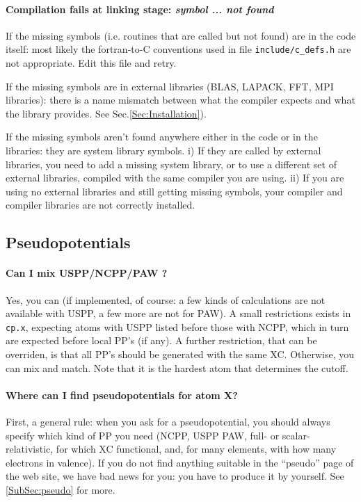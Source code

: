 \documentclass[12pt,a4paper]{article}
\begin{document}
\paragraph{Compilation fails at linking stage: {\em symbol ... not found}}
If the missing symbols (i.e. routines that are called but not found)
are in the code itself: most likely the fortran-to-C conventions used
in file \texttt{include/c\_defs.h} are not appropriate. Edit this file
and retry.

If the missing symbols are in external libraries (BLAS, LAPACK, FFT,
MPI libraries): 
there is a name mismatch between what the compiler expects and what the
library provides. See Sec.\ref{Sec:Installation}).

If the missing symbols aren't found anywhere either in the code or in the
libraries: they are system library symbols. i) If they are called by external 
libraries, you need to add a missing system library, or to use a different 
set of external libraries, compiled with the same compiler you are using. 
ii) If you are using no external libraries and still getting missing symbols, 
your compiler and compiler libraries are not correctly installed.

\subsection{Pseudopotentials}

\paragraph{Can I mix USPP/NCPP/PAW ?}

Yes, you can (if implemented, of course: a few kinds of calculations
are not available with USPP, a few more are not for PAW). A small
restrictions exists in \texttt{cp.x}, expecting atoms with USPP listed before 
those with NCPP, which in turn are expected before local PP's (if any).
A further restriction, that can be overriden,
is that all PP's should be generated with the same XC.
Otherwise, you can mix and match. Note that 
it is the hardest atom that determines the cutoff.

\paragraph{Where can I find pseudopotentials for atom X?}

First, a general rule: when you ask for a pseudopotential, you should
always specify which kind of PP you need (NCPP, USPP
PAW, full- or scalar-relativistic, for which XC functional,
and, for many elements, with how many electrons in valence).
If you do not find anything suitable in the ``pseudo'' page of the web 
site, we have bad news for you: you have to produce it by yourself. 
See \ref{SubSec:pseudo} for more.
\end{document}
